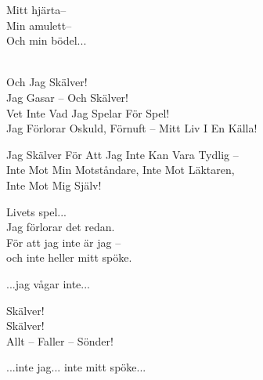 \begin{lyrics}
Mitt hjärta–\\
Min amulett–\\
Och min bödel...

\\
Och Jag Skälver!\\
Jag Gasar – Och Skälver!\\
Vet Inte Vad Jag Spelar För Spel!\\
Jag Förlorar Oskuld, Förnuft – Mitt Liv I En Källa!

Jag Skälver För Att Jag Inte Kan Vara Tydlig –\\
Inte Mot Min Motståndare, Inte Mot Läktaren,\\
Inte Mot Mig Själv!


Livets spel...\\
Jag förlorar det redan.\\
För att jag inte är jag –\\
och inte heller mitt spöke.


...jag vågar inte...

Skälver!\\
Skälver!\\
Allt – Faller – Sönder!

...inte jag... inte mitt spöke...

\end{lyrics}

